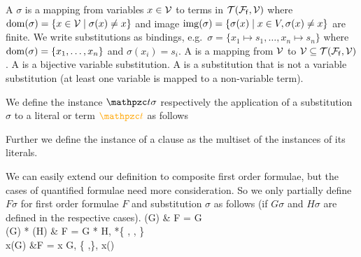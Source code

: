 


\begin{definition}\label{def:substitution}
	A  \( \sigma \) is a mapping from variables \( x\in\mathcal{V} \) to terms in \( {\mathcal{T}(\mathcal{F}_{\mathsf{f}},\mathcal{V})} \)
	where \( \operatorname{dom}(\sigma) = \{ x\in\mathcal{V}\mid\sigma(x) \neq x \} \)
	and image \( \operatorname{img}(\sigma) =\{ \sigma(x) \mid x\in V, \sigma(x)\neq x \} \) are finite.
	We write substitutions as bindings, e.g.~\( \sigma=\{ x_1\mapsto s_1,\ldots,x_n\mapsto s_n \} \)
	where \( \operatorname{dom}(\sigma)=\{ x_1,\ldots,x_n \} \) and \( \sigma(x_i)=s_i \).
	A  is a mapping from \( \mathcal{V} \) to \( \mathcal{V}\subseteq{\mathcal{T}(\mathcal{F}_{\mathsf{f}},\mathcal{V})} \).
	A  is a bijective variable substitution.
	A  is a substitution that is not a variable substitution
	(at least one variable is mapped to a non-variable term).
\end{definition}
\begin{definition}
	We define the instance \( \mct\sigma \)
	respectively the application of a substitution \( \sigma \) to a literal or term \( \foxt \) as follows

\noindent Further we define the instance of a clause as the multiset of the instances of its literals.
\end{definition}

\begin{definition}
	We can easily extend our definition to composite first order formulae,
	but the cases of quantified formulae need more consideration.
	So we only partially define \( F\sigma \) for first order formulae \( F \) and substitution \( \sigma \) as follows (if \( G\sigma \) and \( H\sigma \) are defined in the respective cases).
{
		\lnot(G\sigma) & F = \lnot G
		\\
		(G\sigma) * (H\sigma) & F = G * H, *\in \{ \land, \lor, \limp \}\\
		\quantify x(G\sigma) &F = \quantify x G,
		\quantify\in\{ \forall,\exists \},
		x\not\in\domain(\sigma)
	}
\end{definition}

